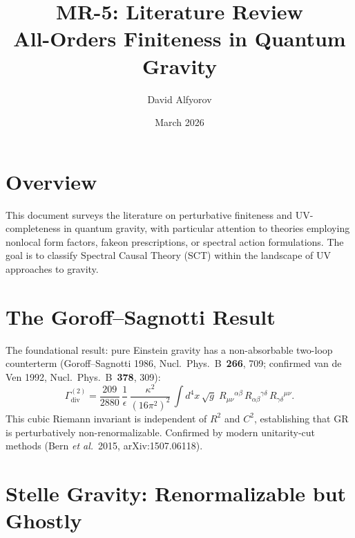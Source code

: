 \documentclass[12pt,a4paper]{article}
\title{\textbf{MR-5: Literature Review\\All-Orders Finiteness in Quantum Gravity}}
\author{David Alfyorov}
\date{March 2026}
\begin{document}
\maketitle
\begin{center}
\end{center}
\tableofcontents
\newpage

\section{Overview}

This document surveys the literature on perturbative finiteness and
UV-completeness in quantum gravity, with particular attention to theories
employing nonlocal form factors, fakeon prescriptions, or spectral action
formulations. The goal is to classify Spectral Causal Theory (SCT)
within the landscape of UV approaches to gravity.

\section{The Goroff--Sagnotti Result}
\label{sec:goroff-sagnotti}

The foundational result: pure Einstein gravity has a non-absorbable
two-loop counterterm (Goroff--Sagnotti 1986, Nucl.\ Phys.\
B~\textbf{266}, 709; confirmed van de Ven 1992, Nucl.\ Phys.\
B~\textbf{378}, 309):
\begin{equation}
  \Gamma_{\mathrm{div}}^{(2)} = \frac{209}{2880}\,\frac{1}{\epsilon}\,
  \frac{\kappa^2}{(16\pi^2)^2}\,
  \int d^4x\,\sqrt{g}\;
  R_{\mu\nu}{}^{\alpha\beta}\,R_{\alpha\beta}{}^{\gamma\delta}\,
  R_{\gamma\delta}{}^{\mu\nu}.
\end{equation}
This cubic Riemann invariant is independent of $R^2$ and $C^2$,
establishing that GR is perturbatively non-renormalizable.
Confirmed by modern unitarity-cut methods (Bern \textit{et al.}\ 2015,
arXiv:1507.06118).

\section{Stelle Gravity: Renormalizable but Ghostly}
\label{sec:stelle}
\end{document}
